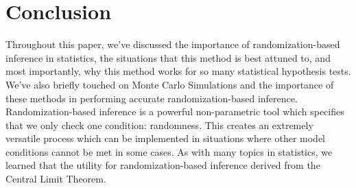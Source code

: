 
\section{Conclusion}

Throughout this paper, we've discussed the importance of randomization-based inference in statistics, the situations that this method is best attuned to, and most importantly, why this method works for so many statistical hypothesis tests. We've also briefly touched on Monte Carlo Simulations and the importance of these methods in performing accurate randomization-based inference. Randomization-based inference is a powerful non-parametric tool which specifies that we only check one condition: randomness. This creates an extremely versatile process which can be implemented in situations where other model conditions cannot be met in some cases. As with many topics in statistics, we learned that the utility for randomization-based inference derived from the Central Limit Theorem. 

{\color{white}\cite{paradoxPaper}\cite{bayesianAnalysis}\cite{hesterbergTextbook}\cite{howDoPermTestsWork}\cite{monteCarloIntro}\cite{randomizationProcedures}\cite{simpleMonteCarlo}\cite{whatTeachersShouldKnow}\cite{wildBootstrap}}

